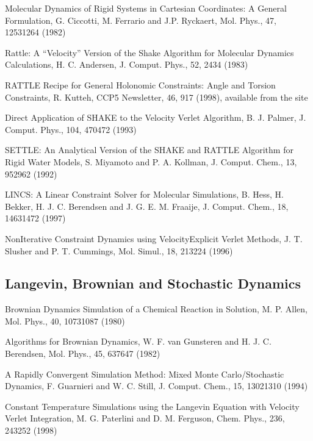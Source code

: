 \documentclass[letterpaper,11pt,english]{sphinxmanual}
\begin{document}
\sphinxAtStartPar
Molecular Dynamics of Rigid Systems in Cartesian Coordinates: A General Formulation, G. Ciccotti, M. Ferrario and J.\sphinxhyphen{}P. Ryckaert, Mol. Phys., 47, 1253\sphinxhyphen{}1264 (1982)

\sphinxAtStartPar
Rattle: A “Velocity” Version of the Shake Algorithm for Molecular Dynamics Calculations, H. C. Andersen, J. Comput. Phys., 52, 24\sphinxhyphen{}34 (1983)

\sphinxAtStartPar
RATTLE Recipe for General Holonomic Constraints: Angle and Torsion Constraints, R. Kutteh, CCP5 Newsletter, 46, 9\sphinxhyphen{}17 (1998), available from the site 

\sphinxAtStartPar
Direct Application of SHAKE to the Velocity Verlet Algorithm, B. J. Palmer, J. Comput. Phys., 104, 470\sphinxhyphen{}472 (1993)

\sphinxAtStartPar
SETTLE: An Analytical Version of the SHAKE and RATTLE Algorithm for Rigid Water Models, S. Miyamoto and P. A. Kollman, J. Comput. Chem., 13, 952\sphinxhyphen{}962 (1992)

\sphinxAtStartPar
LINCS: A Linear Constraint Solver for Molecular Simulations, B. Hess, H. Bekker, H. J. C. Berendsen and J. G. E. M. Fraaije, J. Comput. Chem., 18, 1463\sphinxhyphen{}1472 (1997)

\sphinxAtStartPar
Non\sphinxhyphen{}Iterative Constraint Dynamics using Velocity\sphinxhyphen{}Explicit Verlet Methods, J. T. Slusher and P. T. Cummings, Mol. Simul., 18, 213\sphinxhyphen{}224 (1996)


\subsection{Langevin, Brownian and Stochastic Dynamics}
\label{\detokenize{text/references:langevin-brownian-and-stochastic-dynamics}}
\sphinxAtStartPar
Brownian Dynamics Simulation of a Chemical Reaction in Solution, M. P. Allen, Mol. Phys., 40, 1073\sphinxhyphen{}1087 (1980)

\sphinxAtStartPar
Algorithms for Brownian Dynamics, W. F. van Gunsteren and H. J. C. Berendsen, Mol. Phys., 45, 637\sphinxhyphen{}647 (1982)

\sphinxAtStartPar
A Rapidly Convergent Simulation Method: Mixed Monte Carlo/Stochastic Dynamics, F. Guarnieri and W. C. Still, J. Comput. Chem., 15, 1302\sphinxhyphen{}1310 (1994)

\sphinxAtStartPar
Constant Temperature Simulations using the Langevin Equation with Velocity Verlet Integration, M. G. Paterlini and D. M. Ferguson, Chem. Phys., 236, 243\sphinxhyphen{}252 (1998)
\end{document}
